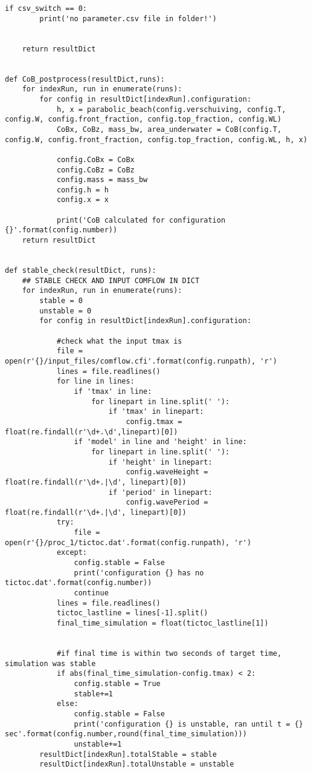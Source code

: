 \begin{mdframed}[backgroundcolor=light-gray, roundcorner=10pt,leftmargin=1, rightmargin=1, innerleftmargin=0, innertopmargin=7,innerbottommargin=0, outerlinewidth=1, linecolor=light-gray]
\begin{lstlisting}[linewidth=\columnwidth,caption=Functions used in post-processing ., label=script: post processing functions]
    if csv_switch == 0:
        print('no parameter.csv file in folder!')


    return resultDict


def CoB_postprocess(resultDict,runs):
    for indexRun, run in enumerate(runs):
        for config in resultDict[indexRun].configuration:
            h, x = parabolic_beach(config.verschuiving, config.T, config.W, config.front_fraction, config.top_fraction, config.WL)
            CoBx, CoBz, mass_bw, area_underwater = CoB(config.T, config.W, config.front_fraction, config.top_fraction, config.WL, h, x)

            config.CoBx = CoBx
            config.CoBz = CoBz
            config.mass = mass_bw
            config.h = h
            config.x = x

            print('CoB calculated for configuration {}'.format(config.number))
    return resultDict


def stable_check(resultDict, runs):
    ## STABLE CHECK AND INPUT COMFLOW IN DICT
    for indexRun, run in enumerate(runs):
        stable = 0
        unstable = 0
        for config in resultDict[indexRun].configuration:

            #check what the input tmax is
            file = open(r'{}/input_files/comflow.cfi'.format(config.runpath), 'r')
            lines = file.readlines()
            for line in lines:
                if 'tmax' in line:
                    for linepart in line.split(' '):
                        if 'tmax' in linepart:
                            config.tmax = float(re.findall(r'\d+.\d',linepart)[0])
                if 'model' in line and 'height' in line:
                    for linepart in line.split(' '):
                        if 'height' in linepart:
                            config.waveHeight = float(re.findall(r'\d+.|\d', linepart)[0])
                        if 'period' in linepart:
                            config.wavePeriod = float(re.findall(r'\d+.|\d', linepart)[0])
            try:
                file = open(r'{}/proc_1/tictoc.dat'.format(config.runpath), 'r')
            except:
                config.stable = False
                print('configuration {} has no tictoc.dat'.format(config.number))
                continue
            lines = file.readlines()
            tictoc_lastline = lines[-1].split()
            final_time_simulation = float(tictoc_lastline[1])


            #if final time is within two seconds of target time, simulation was stable
            if abs(final_time_simulation-config.tmax) < 2:
                config.stable = True
                stable+=1
            else:
                config.stable = False
                print('configuration {} is unstable, ran until t = {} sec'.format(config.number,round(final_time_simulation)))
                unstable+=1
        resultDict[indexRun].totalStable = stable
        resultDict[indexRun].totalUnstable = unstable


\end{lstlisting}
\end{mdframed}

